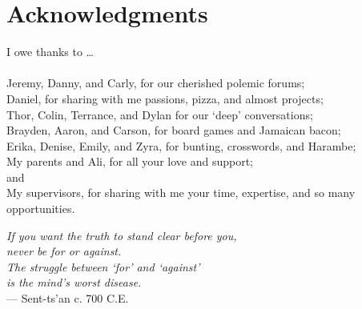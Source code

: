 \section*{Acknowledgments}
I owe thanks to \dots\\
\\Jeremy, Danny, and Carly, for our cherished polemic forums;
\\Daniel, for sharing with me passions, pizza, and almost projects;
\\Thor, Colin, Terrance, and Dylan for our `deep' conversations;
\\Brayden, Aaron, and Carson, for board games and Jamaican bacon;
\\Erika, Denise, Emily, and Zyra, for bunting, crosswords, and Harambe;
\\My parents and Ali, for all your love and support;
\\and
\\My supervisors, for sharing with me your time, expertise, and so many opportunities.
\vfill
\begin{singlespace}
  \hspace*{4.0cm}\textit{If you want the truth to stand clear before you,}\\
  \hspace*{4.5cm}\textit{never be for or against.}                        \\
  \hspace*{4.0cm}\textit{The struggle between `for' and `against'}        \\
  \hspace*{4.5cm}\textit{is the mind's worst disease.}                    \\[0.5em]
  \hspace*{9.0cm}\normalfont --- Sent-ts'an c. 700 C.E.      
\end{singlespace}

